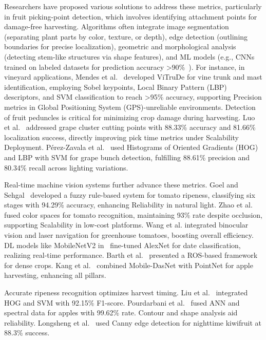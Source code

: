 \documentclass{ieeeaccess}
\begin{document}
Researchers have proposed various solutions to address these metrics, particularly in fruit picking-point detection, which involves identifying attachment points for damage-free harvesting. Algorithms often integrate image segmentation (separating plant parts by color, texture, or depth), edge detection (outlining boundaries for precise localization), geometric and morphological analysis (detecting stem-like structures via shape features), and ML models (e.g., CNNs trained on labeled datasets for prediction accuracy >90\%~\cite{mendes2016vine}).
For instance, in vineyard applications, Mendes et al.~\cite{mendes2016vine} developed ViTruDe for vine trunk and mast identification, employing Sobel keypoints, Local Binary Pattern (LBP) descriptors, and SVM classification to reach >95\% accuracy, supporting Precision metrics in  Global Positioning System (GPS)-unreliable environments.
Detection of fruit peduncles is critical for minimizing crop damage during harvesting. 
Luo et al.~\cite{luo2018vision} addressed grape cluster cutting points with 88.33\% accuracy and 81.66\% localization success, directly improving pick time metrics under Scalability Deployment.
Pérez-Zavala et al.~\cite{perez2018pattern} used Histograms of Oriented Gradients (HOG) and LBP with SVM for grape bunch detection, fulfilling 88.61\% precision and 80.34\% recall across lighting variations.

Real-time machine vision systems further advance these metrics. 
Goel and Sehgal~\cite{goel2015fuzzy} developed a fuzzy rule-based system for tomato ripeness, classifying six stages with 94.29\% accuracy, enhancing Reliability in natural light. 
Zhao et al.~\cite{zhao2016robust} fused color spaces for tomato recognition, maintaining 93\% rate despite occlusion, supporting Scalability in low-cost platforms.
Wang et al.\cite{lili2017development} integrated binocular vision and laser navigation for greenhouse tomatoes, boosting overall efficiency.
DL models like MobileNetV2 in~\cite{altaheri2019date} fine-tuned AlexNet for date classification, realizing real-time performance. 
Barth et al.~\cite{barth2016design} presented a ROS-based framework for dense crops.
Kang et al.~\cite{kang2020real}  combined Mobile-DasNet with PointNet for apple harvesting, enhancing all pillars.

Accurate ripeness recognition optimizes harvest timing. 
Liu et al.~\cite{liu2019mature} integrated HOG and SVM with 92.15\% F1-score. 
Pourdarbani et al.~\cite{pourdarbani2020automatic} fused ANN and spectral data for apples with 99.62\% rate.
Contour and shape analysis aid reliability. 
Longsheng et al.~\cite{longsheng2015kiwifruit} used Canny edge detection for nighttime kiwifruit at 88.3\% success.
\end{document}
